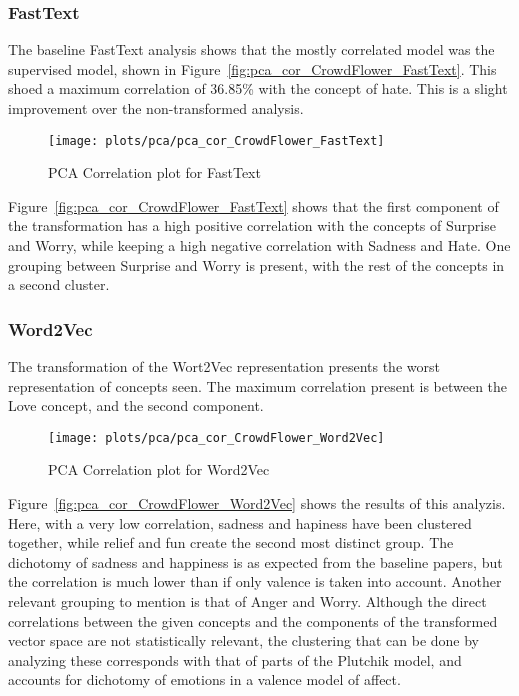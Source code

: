 \subsubsection{FastText}
The baseline FastText analysis shows that the mostly correlated model was the supervised model, shown in Figure~\ref{fig:pca_cor_CrowdFlower_FastText}. This shoed a maximum correlation of 36.85\% with the concept of hate. This is a slight improvement over the non-transformed analysis.
\begin{figure}[H]
  \texttt{[image: plots/pca/pca\_cor\_CrowdFlower\_FastText]}
  \centering
  \caption{PCA Correlation plot for FastText}
\end{figure}\label{fig:pca_cor_CrowdFlower_FastText}
Figure~\ref{fig:pca_cor_CrowdFlower_FastText} shows that the first component of the transformation has a high positive correlation with the concepts of Surprise and Worry, while keeping a high negative correlation with Sadness and Hate. One grouping between Surprise and Worry is present, with the rest of the concepts in a second cluster.

\subsubsection{Word2Vec}
The transformation of the Wort2Vec representation presents the worst representation of concepts seen. The maximum correlation present is between the Love concept, and the second component.
\begin{figure}[H]
  \texttt{[image: plots/pca/pca\_cor\_CrowdFlower\_Word2Vec]}
  \centering
  \caption{PCA Correlation plot for Word2Vec}
\end{figure}\label{fig:pca_cor_CrowdFlower_Word2Vec}
Figure~\ref{fig:pca_cor_CrowdFlower_Word2Vec} shows the results of this analyzis. Here, with a very low correlation, sadness and hapiness have been clustered together, while relief and fun create the second most distinct group. The dichotomy of sadness and happiness is as expected from the baseline papers, but the correlation is much lower than if only valence is taken into account.
Another relevant grouping to mention is that of Anger and Worry. Although the direct correlations between the given concepts and the components of the transformed vector space are not statistically relevant, the clustering that can be done by analyzing these corresponds with that of parts of the Plutchik model, and accounts for dichotomy of emotions in a valence model of affect.

